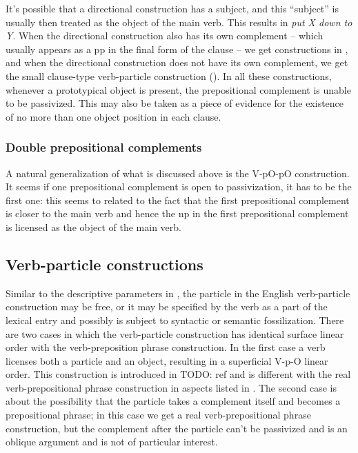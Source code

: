 \documentclass[UTF8, a4paper, oneside, scheme=plain, 12pt]{ctexbook}
\newcommand*{\citesec}[1]{\S~{#1}}
\newcommand*{\citechap}[1]{Ch.~{#1}}
\newcommand{\form}[1]{\emph{#1}}
\begin{document}
It's possible that a directional construction has a subject,
and this ``subject''  is usually then treated as the object of the main verb.
This results in \form{put X down to Y}.
When the directional construction also has its own complement -- 
which usually appears as a \ac{pp} in the final form of the clause --
we get constructions in ,
and when the directional construction does not have its own complement,
we get the small clause-type verb-particle construction 
(). 
In all these constructions, whenever a prototypical object is present, 
the prepositional complement is unable to be passivized.
This may also be taken as a piece of evidence for the existence of 
no more than one object position in each clause. 

\subsubsection{Double prepositional complements}

A natural generalization of what is discussed above is 
the V-pO-pO construction.
It seems if one prepositional complement is open to passivization,
it has to be the first one:
this seems to related to the fact that the first prepositional complement
is closer to the main verb
and hence the \ac{np} in the first prepositional complement
is licensed as the object of the main verb.

\subsection{Verb-particle constructions}\label{sec:vp.valence.verb-particle}

Similar to the descriptive parameters in ,
the particle in the English verb-particle construction may be free, 
or it may be specified by the verb as a part of the lexical entry
and possibly is subject to syntactic or semantic fossilization. 
There are two cases in which the verb-particle construction 
has identical surface linear order 
with the verb-preposition phrase construction.
In the first case a verb licenses both a particle and an object,
resulting in a superficial V-p-O linear order. 
This construction is introduced in TODO: ref
and is different with the real verb-prepositional phrase construction
in aspects listed in \citet[\citechap{4}, \citesec{6.2}]{cgel}.
The second case is about the possibility that the particle takes a complement itself 
and becomes a prepositional phrase;
in this case we get a real verb-prepositional phrase construction,
but the complement after the particle can't be passivized
and is an oblique argument and is not of particular interest.
\end{document}
